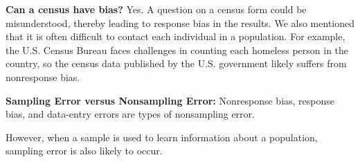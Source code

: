 \documentclass{report}
\begin{document}
        \bigbreak \noindent 
        \textbf{Can a census have bias? }
        \bigbreak \noindent 
        Yes.
        \bigbreak \noindent 
        A question on a census form could be misunderstood, thereby leading to response bias in the results.
        \bigbreak \noindent 
        We also mentioned that it is often difficult to contact each individual in a population. For example, the U.S. Census Bureau faces challenges in counting each homeless person in the country, so the census data published by the U.S. government likely suffers from nonresponse bias.

        \bigbreak \noindent 
        \textbf{Sampling Error versus Nonsampling Error:}
        \bigbreak \noindent 
        Nonresponse bias, response bias, and data-entry errors are types of nonsampling error.

        \bigbreak \noindent 
        However, when a sample is used to learn information about a population, sampling error is also likely to occur.
        \bigbreak \noindent 

        \pagebreak \bigbreak \noindent
\end{document}
